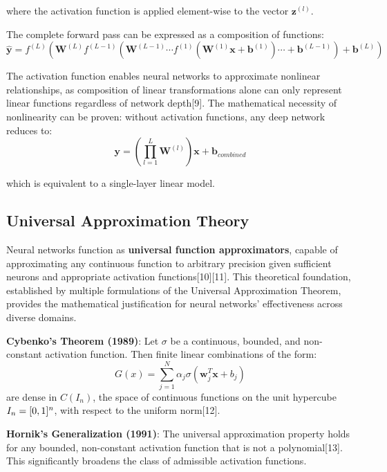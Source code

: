 \documentclass[11pt,a4paper]{report}
\begin{document}
where the activation function is applied element-wise to the vector $\mathbf{z}^{(l)}$.

The complete forward pass can be expressed as a composition of functions:
\begin{equation}
\hat{\mathbf{y}} = f^{(L)}(\mathbf{W}^{(L)} f^{(L-1)}(\mathbf{W}^{(L-1)} \cdots f^{(1)}(\mathbf{W}^{(1)} \mathbf{x} + \mathbf{b}^{(1)}) \cdots + \mathbf{b}^{(L-1)}) + \mathbf{b}^{(L)})
\end{equation}

The activation function enables neural networks to approximate nonlinear relationships, as composition of linear transformations alone can only represent linear functions regardless of network depth[9]. The mathematical necessity of nonlinearity can be proven: without activation functions, any deep network reduces to:
\begin{equation}
\mathbf{y} = \left(\prod_{l=1}^{L} \mathbf{W}^{(l)}\right) \mathbf{x} + \mathbf{b}_{combined}
\end{equation}

which is equivalent to a single-layer linear model.

\subsection{Universal Approximation Theory}

Neural networks function as \textbf{universal function approximators}, capable of approximating any continuous function to arbitrary precision given sufficient neurons and appropriate activation functions[10][11]. This theoretical foundation, established by multiple formulations of the Universal Approximation Theorem, provides the mathematical justification for neural networks' effectiveness across diverse domains.

\textbf{Cybenko's Theorem (1989)}: Let $\sigma$ be a continuous, bounded, and non-constant activation function. Then finite linear combinations of the form:
\begin{equation}
G(x) = \sum_{j=1}^{N} \alpha_j \sigma(\mathbf{w}_j^T \mathbf{x} + b_j)
\end{equation}
are dense in $C(I_n)$, the space of continuous functions on the unit hypercube $I_n = [0,1\relax]^n$, with respect to the uniform norm[12].

\textbf{Hornik's Generalization (1991)}: The universal approximation property holds for any bounded, non-constant activation function that is not a polynomial[13]. This significantly broadens the class of admissible activation functions.
\end{document}
